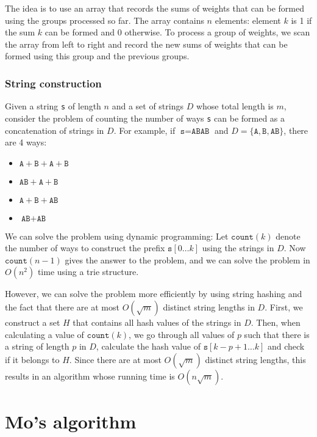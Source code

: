 The idea is to use an array that records the sums of weights
that can be formed using the groups processed so far.
The array contains $n$ elements: element $k$ is 1 if the sum
$k$ can be formed and 0 otherwise.
To process a group of weights, we scan the array
from left to right and record the new sums of weights that
can be formed using this group and the previous groups.

\subsubsection{String construction}

Given a string \texttt{s} of length $n$
and a set of strings $D$ whose total length is $m$,
consider the problem of counting the number of ways
\texttt{s} can be formed as a concatenation of strings in $D$.
For example,
if $\texttt{s}=\texttt{ABAB}$ and
$D=\{\texttt{A},\texttt{B},\texttt{AB}\}$,
there are 4 ways:

\begin{itemize}[noitemsep]
\item $\texttt{A}+\texttt{B}+\texttt{A}+\texttt{B}$
\item $\texttt{AB}+\texttt{A}+\texttt{B}$
\item $\texttt{A}+\texttt{B}+\texttt{AB}$
\item $\texttt{AB}+\texttt{AB}$
\end{itemize}

We can solve the problem using dynamic programming:
Let $\texttt{count}(k)$ denote the number of ways to construct the prefix
$\texttt{s}[0 \ldots k]$ using the strings in $D$.
Now $\texttt{count}(n-1)$ gives the answer to the problem,
and we can solve the problem in $O(n^2)$ time
using a trie structure.

However, we can solve the problem more efficiently
by using string hashing and the fact that there
are at most $O(\sqrt m)$ distinct string lengths in $D$.
First, we construct a set $H$ that contains all
hash values of the strings in $D$.
Then, when calculating a value of $\texttt{count}(k)$,
we go through all values of $p$
such that there is a string of length $p$ in $D$,
calculate the hash value of $\texttt{s}[k-p+1 \ldots k]$
and check if it belongs to $H$.
Since there are at most $O(\sqrt m)$ distinct string lengths,
this results in an algorithm whose running time is $O(n \sqrt m)$.

\section{Mo's algorithm}

